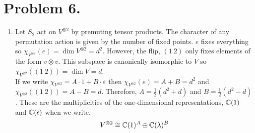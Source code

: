 \documentclass[12pt]{extarticle}
\begin{document}
\section*{Problem 6.}
\begin{enumerate}
\item 
Let $S_2$ act on $V^{\otimes 2}$ by premuting tensor products. The character of any permutation action is given by the number of fixed points. $e$ fixes everything so $\chi_{V^{\otimes 2}}(e) = \dim{V^{\otimes 2}} = d^2$. However, the flip, $(1 \: 2)$ only fixes elements of the form $v \otimes v$. This subspace is canonically isomorphic to $V$ so $\chi_{V^{\otimes 2}}((1 \: 2)) = \dim{V} = d$. \bigskip \\
If we write $\chi_{V^{\otimes 2}} = A \cdot 1 + B \cdot \varepsilon$ then $\chi_{V^{\otimes 2}}(e) = A + B = d^2$ and $\chi_{V^{\otimes 2}}((1 \: 2)) = A - B = d$. Therefore, $A = \tfrac{1}{2}(d^2 + d)$ and $B = \tfrac{1}{2} (d^2 - d)$. These are the multiplicities of the one-dimensional representations, $\mathbb{C}(1)$ and $\mathbb{C}(\epsilon)$ when we write,
\[ V^{\otimes 2} \cong \mathbb{C}(1)^A \oplus \mathbb{C}(\lambda)^B \] 


\end{enumerate}
\end{document}
